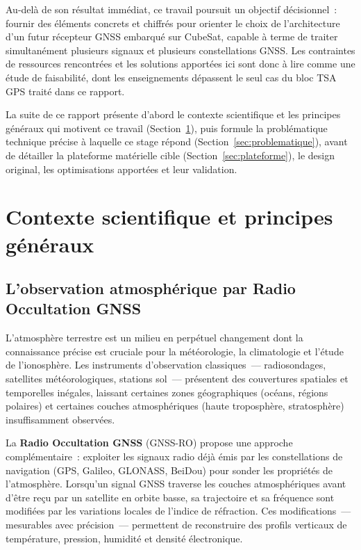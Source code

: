 \documentclass[11pt,a4paper]{article}
\begin{document}
Au-delà de son résultat immédiat, ce travail poursuit un objectif décisionnel~: fournir des éléments concrets et chiffrés pour orienter le choix de l'architecture d'un futur récepteur GNSS embarqué sur CubeSat, capable à terme de traiter simultanément plusieurs signaux et plusieurs constellations GNSS. Les contraintes de ressources rencontrées et les solutions apportées ici sont donc à lire comme une étude de faisabilité, dont les enseignements dépassent le seul cas du bloc TSA GPS traité dans ce rapport.

La suite de ce rapport présente d'abord le contexte scientifique et les principes généraux qui motivent ce travail (Section~\ref{sec:contexte}), puis formule la problématique technique précise à laquelle ce stage répond (Section~\ref{sec:problematique}), avant de détailler la plateforme matérielle cible (Section~\ref{sec:plateforme}), le design original, les optimisations apportées et leur validation.

\section{Contexte scientifique et principes généraux}
\label{sec:contexte}

\subsection{L'observation atmosphérique par Radio Occultation GNSS}

L'atmosphère terrestre est un milieu en perpétuel changement dont la connaissance précise est cruciale pour la météorologie, la climatologie et l'étude de l'ionosphère. Les instruments d'observation classiques~--- radiosondages, satellites météorologiques, stations sol~--- présentent des couvertures spatiales et temporelles inégales, laissant certaines zones géographiques (océans, régions polaires) et certaines couches atmosphériques (haute troposphère, stratosphère) insuffisamment observées.

La \textbf{Radio Occultation GNSS} (GNSS-RO) propose une approche complémentaire~: exploiter les signaux radio déjà émis par les constellations de navigation (GPS, Galileo, GLONASS, BeiDou) pour sonder les propriétés de l'atmosphère. Lorsqu'un signal GNSS traverse les couches atmosphériques avant d'être reçu par un satellite en orbite basse, sa trajectoire et sa fréquence sont modifiées par les variations locales de l'indice de réfraction. Ces modifications~--- mesurables avec précision~--- permettent de reconstruire des profils verticaux de température, pression, humidité et densité électronique.
\end{document}

